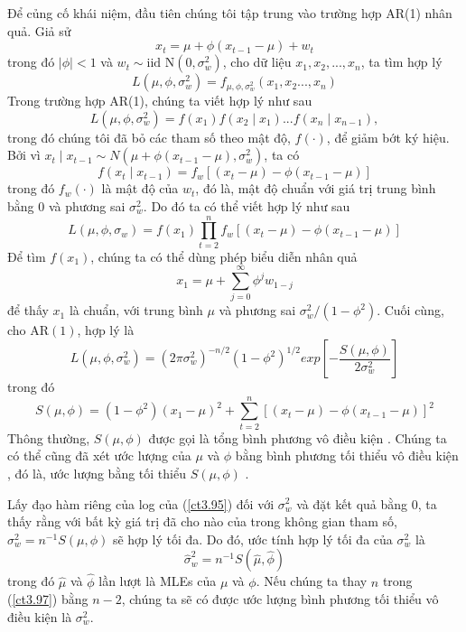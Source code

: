 \documentclass[12pt, a4paper,oneside]{book}
\theoremstyle{definition}
\begin{document}
Để củng cố khái niệm, đầu tiên chúng tôi tập trung vào trường hợp AR(1)  nhân quả. Giả sử
$$ x_{t}=\mu + \phi(x_{t-1}-\mu)+w_{t} $$
trong đó $\mid\phi\mid<1$ và $ w_{t}\sim \text{iid N}(0,\sigma_{w}^2) $, cho dữ liệu $ x_{1}, x_{2},. . . , x_{n} $, ta tìm hợp lý 
$$ L(\mu,\phi,\sigma_{w}^2)= f_{\mu,\phi,\sigma_{w}^2}(x_{1},x_{2}. . . , x_{n}) $$ 
Trong trường hợp AR(1), chúng ta viết hợp lý như sau
$$ L(\mu,\phi,\sigma_{w}^2)= f(x_{1})f(x_{2}\mid x_{1})...f(x_{n}\mid x_{n-1}), $$
trong đó chúng tôi đã bỏ các tham số theo mật độ, $ f(\cdot) $, để giảm bớt ký hiệu. Bởi vì $ x_{t}\mid x_{t-1} \sim N(\mu + \phi(x_{t-1}-\mu),\sigma_{w}^2) $, ta có
$$ f(x_{t}\mid x_{t-1})=f_{w}[(x_{t}-\mu)-\phi(x_{t-1}-\mu)]  $$
trong đó $ f_{w}(\cdot) $ là mật độ của $ w_{t} $, đó là, mật độ chuẩn với giá trị trung bình bằng 0 và phương sai $ \sigma_{w}^2 $. Do đó ta có thể viết hợp lý như sau
$$ L(\mu,\phi,\sigma_{w})= f(x_{1})\prod_{t=2}^{n}f_{w}[(x_{t}-\mu)-\phi(x_{t-1}-\mu)]  $$
Để tìm $ f(x_{1}) $, chúng ta có thể dùng phép biểu diễn  nhân quả
$$ x_{1}=\mu + \sum_{j=0}^{\infty}\phi^{j}w_{1-j} $$ 
để thấy $ x_{1} $ là chuẩn, với trung bình $ \mu $ và phương sai $ \sigma_{w}^2/(1-\phi^{2}) $. Cuối cùng, cho AR$(1)$, hợp lý là
\begin{equation}
L(\mu,\phi,\sigma_{w}^2)=(2\pi\sigma_{w}^2)^{-n/2}(1-\phi^{2})^{1/2}exp[-\dfrac{S(\mu,\phi)}{2\sigma_{w}^2}] \label{ct3.95}
\end{equation}
trong đó 
\begin{equation}
S(\mu,\phi)=(1-\phi^{2})(x_{1}-\mu)^{2}+\sum_{t=2}^{n}[(x_{t}-\mu)-\phi(x_{t-1}-\mu)]^{2} \label{ct3.96}
\end{equation}
Thông thường, $S (\mu,\phi )$ được gọi là tổng bình phương vô điều kiện . Chúng ta có thể cũng đã xét ước lượng của $\mu$ và $\phi$ bằng bình phương tối thiểu vô điều kiện , đó là, ước lượng bằng tối thiểu  $S (\mu,\phi )$ . 

Lấy đạo hàm riêng của log của (\ref{ct3.95}) đối với $\sigma^{2}_{w}$ và đặt kết quả bằng $0$, ta thấy rằng với bất kỳ giá trị đã cho nào của  trong không gian tham số, $\sigma^{2}_{w}=n^{-1}S({\mu},{\phi})$ sẽ hợp lý tối đa. Do đó, ước tính hợp lý tối đa của $\sigma^{2}_{w}$ là
\begin{equation}
\hat{\sigma}^{2}_{w}=n^{-1}S(\hat{\mu},\hat{\phi}) \label{ct3.97}
\end{equation}
trong đó $\hat{\mu}$ và $\hat{\phi}$ lần lượt là MLEs của $\mu$ và $\phi$. Nếu chúng ta thay $n$ trong (\ref{ct3.97}) bằng $n - 2$, chúng ta sẽ có được ước lượng bình phương tối thiểu vô điều kiện là $\sigma^{2}_{w}$.
\end{document}
